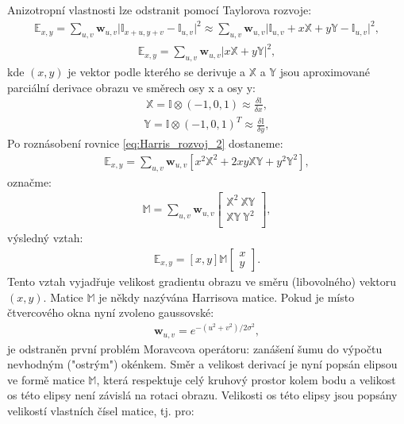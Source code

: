 Anizotropní vlastnosti lze odstranit pomocí Taylorova rozvoje:
\begin{align}	
\mathbb{E}_{x,y} = \sum_{u,v} \mathbf{w}_{u,v} \lvert \mathbb{I}_{x+u, y+v} - \mathbb{I}_{u,v} \rvert^2
\approx \sum_{u,v} \mathbf{w}_{u,v} \lvert \mathbb{I}_{u, v} + x\mathbb{X} + y\mathbb{Y}  - \mathbb{I}_{u,v} \rvert^2,
\end{align}
\begin{align}
\label{eq:Harris_rozvoj_2}
\mathbb{E}_{x,y} = \sum_{u,v} \mathbf{w}_{u,v} \lvert x\mathbb{X} + y\mathbb{Y} \rvert^2,
\end{align}
\noindent kde $(x,y)$ je vektor podle kterého se derivuje a $\mathbb{X}$ a $\mathbb{Y}$ jsou aproximované parciální derivace obrazu ve směrech osy x a osy y:
\begin{align}
\mathbb{X} = \mathbb{I} \otimes (-1, 0, 1) \approx \frac{\delta \mathbb{I}}{\delta x},
\end{align}
\begin{align}
\mathbb{Y} = \mathbb{I} \otimes (-1, 0, 1)^T \approx \frac{\delta \mathbb{I}}{\delta y},
\end{align}
\noindent Po roznásobení rovnice \ref{eq:Harris_rozvoj_2} dostaneme:
\begin{align}
\mathbb{E}_{x,y} = \sum_{u,v} \mathbf{w}_{u,v} [x^2\mathbb{X}^2 + 2xy\mathbb{X}\mathbb{Y} + y^2\mathbb{Y}^2],
\end{align}
označme:
\begin{align}
\mathbb{M} = \sum_{u,v} \mathbf{w}_{u,v} 
\begin{bmatrix}
\mathbb{X}^2  \  \mathbb{XY} \\
\mathbb{XY}    \ \mathbb{Y}^2 \\
\end{bmatrix},
\end{align}
výsledný vztah:
\begin{align}
\mathbb{E}_{x,y} = [x, y] \mathbb{M} \begin{bmatrix} x \\ y \end{bmatrix}.
\end{align}
Tento vztah vyjadřuje velikost gradientu obrazu ve směru (libovolného) vektoru $(x,y)$. Matice $\mathbb{M}$ je někdy nazývána Harrisova matice.
Pokud je místo čtvercového okna nyní zvoleno gaussovské:
\begin{align}
\mathbf{w}_{u,v} = e^{-(u^2 + v^2)/2\sigma^2},
\end{align}
je odstraněn první problém Moravcova operátoru: zanášení šumu do výpočtu nevhodným ("ostrým") okénkem. Směr a velikost derivací je nyní popsán elipsou ve formě matice $\mathbb{M}$, která respektuje celý kruhový prostor kolem bodu a velikost os této elipsy není závislá na rotaci obrazu. Velikosti os této elipsy jsou popsány velikostí vlastních čísel matice, tj. pro:

